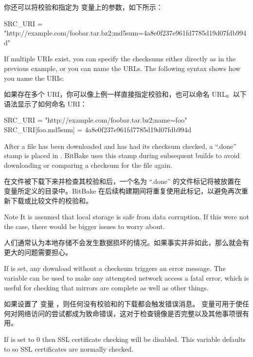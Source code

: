 你还可以将校验和指定为  变量上的参数，如下所示：

\begin{pyglist}
SRC_URI = "http://example.com/foobar.tar.bz2;md5sum=4a8e0f237e961fd7785d19d07fdb994d"
\end{pyglist}

If multiple URIs exist, you can specify the checksums either directly as in the previous example, or you can name the URLs. The following syntax shows how you name the URIs:

如果存在多个 URI，你可以像上例一样直接指定校验和，也可以命名 URL。以下语法显示了如何命名 URI：

\begin{pyglist}
SRC_URI = "http://example.com/foobar.tar.bz2;name=foo"
SRC_URI[foo.md5sum] = 4a8e0f237e961fd7785d19d07fdb994d
\end{pyglist}


After a file has been downloaded and has had its checksum checked, a ``.done'' stamp is placed in . BitBake uses this stamp during subsequent builds to avoid downloading or comparing a checksum for the file again.

在文件被下载下来并检查其校验和后，一个名为 ``.done'' 的文件标记将被放置在  变量所定义的目录中。BitBake 在后续构建期间将重复使用此标记，以避免再次重新下载或比较文件的校验和。

\medskip
\begin{noteblock}{Note}%
It is assumed that local storage is safe from data corruption. If this were not the case, there would be bigger issues to worry about.

\medskip
人们通常认为本地存储不会发生数据损坏的情况。如果事实并非如此，那么就会有更大的问题需要担心。
\end{noteblock}

If  is set, any download without a checksum triggers an error message. The  variable can be used to make any attempted network access a fatal error, which is useful for checking that mirrors are complete as well as other things.

如果设置了  变量 ，则任何没有校验和的下载都会触发错误消息。 变量可用于使任何对网络访问的尝试都成为致命错误，这对于检查镜像是否完整以及其他事项很有用。

If  is set to 0 then SSL certificate checking will be disabled. This variable defaults to  so SSL certificates are normally checked.

